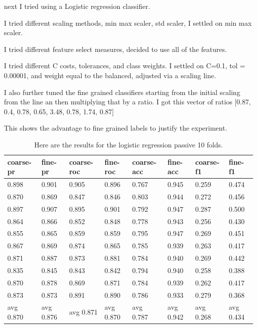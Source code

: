 \documentclass[ms]{nuthesis}
\begin{document}
\par next I tried using a Logistic regression classifier.
\par I tried different scaling methods, min max scaler, std scaler, I settled on min max scaler.
\par I tried different feature select measures, decided to use all of the features.
\par I tried different C costs, tolerances, and class weights. I settled on C=0.1, tol = 0.00001,
and weight equal to the balanced, adjusted via a scaling line.
\par I also further tuned the fine grained classifiers starting from the initial scaling from the
line an then multiplying that by a ratio.
I got this vector of ratios
[0.87, 0.4, 0.78, 0.65, 3.48, 0.78, 1.74, 0.87]
\par This shows the advantage to fine grained labels to justify the experiment.

\FloatBarrier
\begin{table}[h]
  \centering
  \begin{tabular}{|l||l||l||l||l||l||l||l|}\toprule
    coarse-pr & fine-pr & coarse-roc & fine-roc & coarse-acc & fine-acc & coarse-f1 & fine-f1 \\ \midrule
    0.898 & 0.901 & 0.905 & 0.896 & 0.767 & 0.945 & 0.259 & 0.474 \\
    0.870 & 0.869 & 0.847 & 0.846 & 0.803 & 0.944 & 0.272 & 0.456 \\
    0.897 & 0.907 & 0.895 & 0.901 & 0.792 & 0.947 & 0.287 & 0.500 \\
    0.864 & 0.866 & 0.852 & 0.848 & 0.778 & 0.943 & 0.256 & 0.430 \\
    0.855 & 0.865 & 0.859 & 0.859 & 0.795 & 0.947 & 0.269 & 0.451 \\
    0.867 & 0.869 & 0.874 & 0.865 & 0.785 & 0.939 & 0.263 & 0.417 \\
    0.871 & 0.887 & 0.873 & 0.881 & 0.784 & 0.940 & 0.269 & 0.442 \\
    0.835 & 0.845 & 0.843 & 0.842 & 0.794 & 0.940 & 0.258 & 0.388 \\
    0.870 & 0.878 & 0.869 & 0.871 & 0.784 & 0.939 & 0.262 & 0.417 \\
    0.873 & 0.873 & 0.891 & 0.890 & 0.786 & 0.933 & 0.279 & 0.368 \\
    avg 0.870 & avg 0.876 & avg 0.871 & avg 0.870 & avg 0.787 & avg 0.942 & avg 0.268 & avg 0.434 \\ \bottomrule
  \end{tabular}
  \caption{Here are the results for the logistic regression passive 10 folds.}
  \label{tab:logReg}
\end{table}
\FloatBarrier
\end{document}
